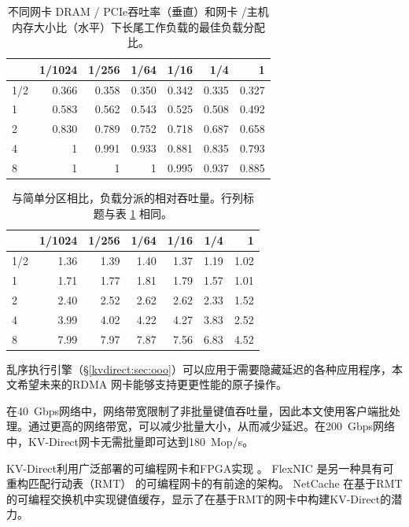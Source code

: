 \begin{table}[htbp]
	\centering
	\caption{不同网卡 DRAM / PCIe吞吐率（垂直）和网卡 /主机内存大小比（水平）下长尾工作负载的最佳负载分配比。}
	\label{kvdirect:tab:optimal-load-dispatch}
	\small
	\begin{tabular}{|l|r|r|r|r|r|r|}
		\hline
		& 1/1024 & 1/256 & 1/64 & 1/16 & 1/4 & 1 \\
		\hline
		1/2  & 0.366 & 0.358 & 0.350 & 0.342 & 0.335 & 0.327 \\
		\hline
		1    & 0.583 & 0.562 & 0.543 & 0.525 & 0.508 & 0.492 \\
		\hline
		2    & 0.830 & 0.789 & 0.752 & 0.718 & 0.687 & 0.658 \\
		\hline
		4    & 1     & 0.991 & 0.933 & 0.881 & 0.835 & 0.793 \\
		\hline
		8    & 1     & 1     & 1     & 0.995 & 0.937 & 0.885 \\
		\hline
	\end{tabular}
\end{table}


\begin{table}[htbp]
	\centering
	\caption{与简单分区相比，负载分派的相对吞吐量。行列标题与表 \ref{kvdirect:tab:optimal-load-dispatch} 相同。}
	\label{kvdirect:tab:optimal-load-dispatch-throughput}
	\small
	\begin{tabular}{|l|r|r|r|r|r|r|}
		\hline
		& 1/1024 & 1/256 & 1/64 & 1/16 & 1/4 & 1 \\
		\hline
		1/2 & 1.36	& 1.39	& 1.40	& 1.37	& 1.19	& 1.02 \\ 
		\hline
		1	& 1.71	& 1.77	& 1.81	& 1.79	& 1.57	& 1.01 \\
		\hline
		2	& 2.40	& 2.52	& 2.62	& 2.62	& 2.33	& 1.52 \\
		\hline
		4	& 3.99	& 4.02	& 4.22	& 4.27	& 3.83	& 2.52 \\
		\hline
		8	& 7.99	& 7.97	& 7.87	& 7.56	& 6.83	& 4.52 \\
		\hline
	\end{tabular}
\end{table}


乱序执行引擎（\S \ref {kvdirect:sec:ooo}）可以应用于需要隐藏延迟的各种应用程序，本文希望未来的RDMA 网卡能够支持更更性能的原子操作。

在40~Gbps网络中，网络带宽限制了非批量键值吞吐量，因此本文使用客户端批处理。通过更高的网络带宽，可以减少批量大小，从而减少延迟。在200~Gbps网络中，KV-Direct网卡无需批量即可达到180~Mop/s。

KV-Direct利用广泛部署的可编程网卡和FPGA实现 \cite{putnam2014reconfigurable,caulfield2016cloud}。 FlexNIC \cite {kaufmann2015flexnic,kaufmann2016krishnamurthy} 是另一种具有可重构匹配行动表（RMT） \cite {bosshart2013forwarding} 的可编程网卡的有前途的架构。
NetCache \cite {netcache-sosp17} 在基于RMT的可编程交换机中实现键值缓存，显示了在基于RMT的网卡中构建KV-Direct的潜力。

